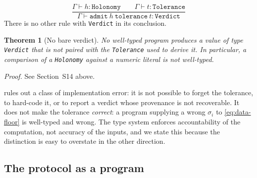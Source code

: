 \documentclass[11pt,a4paper]{article}
\newtheorem{theorem}{Theorem}[section]
\theoremstyle{definition}
\theoremstyle{remark}
\newcommand{\cf}[1]{\texttt{#1}}
\begin{document}
\begin{rulename}
\label{rule:verdict}
\[
  \frac{\Gamma\vdash h : \cf{Holonomy}
        \qquad \Gamma\vdash t : \cf{Tolerance}}
       {\Gamma\vdash \cf{admit}\ h\ \cf{tolerance}\ t : \cf{Verdict}}
\]
There is no other rule with \cf{Verdict} in its conclusion.
\end{rulename}

\begin{theorem}[No bare verdict]
\label{thm:no-bare-verdict}
No well-typed program produces a value of type \cf{Verdict} that is not
paired with the \cf{Tolerance} used to derive it. In particular, a
comparison of a \cf{Holonomy} against a numeric literal is not
well-typed.
\end{theorem}

\noindent\emph{Proof.} See Section~S14 above.

\begin{remark}
\label{rem:type-limits}
 rules out a class of implementation error:
it is not possible to forget the tolerance, to hard-code it, or to
report a verdict whose provenance is not recoverable. It does not make
the tolerance \emph{correct}: a program supplying a wrong $\sigma_i$ to
\eqref{eq:data-floor} is well-typed and wrong. The type system enforces
accountability of the computation, not accuracy of the inputs, and we
state this because the distinction is easy to overstate in the other
direction.
\end{remark}

\subsection*{The protocol as a program}
\end{document}
